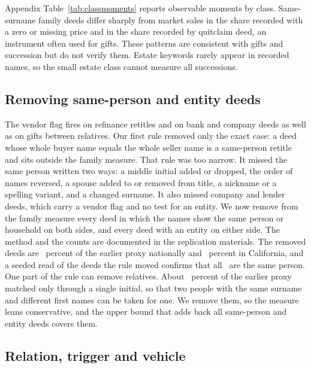 Appendix Table~\ref{tab:classmoments} reports observable moments by class. Same-surname family deeds differ sharply from market sales in the share recorded with a zero or missing price and in the share recorded by quitclaim deed, an instrument often used for gifts. These patterns are consistent with gifts and succession but do not verify them. Estate keywords rarely appear in recorded names, so the small estate class cannot measure all successions.

\subsection{Removing same-person and entity deeds}\label{subsec:samep}

The vendor flag fires on refinance retitles and on bank and company deeds as well as on gifts between relatives. Our first rule removed only the exact case: a deed whose whole buyer name equals the whole seller name is a same-person retitle and sits outside the family measure. That rule was too narrow. It missed the same person written two ways: a middle initial added or dropped, the order of names reversed, a spouse added to or removed from title, a nickname or a spelling variant, and a changed surname. It also missed company and lender deeds, which carry a vendor flag and no test for an entity. We now remove from the family measure every deed in which the names show the same person or household on both sides, and every deed with an entity on either side. The method and the counts are documented in the replication materials. The removed deeds are \SIIISamePEntityShareOfOldNat\ percent of the earlier proxy nationally and \SIIISamePEntityShareOfOldCA\ percent in California, and a seeded read of the deeds the rule moved confirms that all \SIIIReadMovedSamePersonN\ are the same person. One part of the rule can remove relatives. About \SIIIInitialOnlyShareOfOld\ percent of the earlier proxy matched only through a single initial, so that two people with the same surname and different first names can be taken for one. We remove them, so the measure leans conservative, and the upper bound that adds back all same-person and entity deeds covers them.

\subsection{Relation, trigger and vehicle}\label{subsec:taxonomy}

